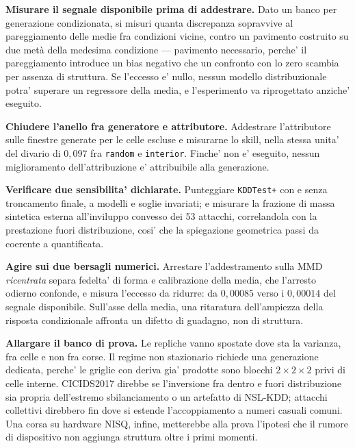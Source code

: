 \documentclass[10pt,conference,a4paper,twocolumn]{IEEEtran}
\begin{document}
\textbf{Misurare il segnale disponibile prima di addestrare.} Dato un banco per generazione condizionata, si misuri quanta discrepanza sopravvive al pareggiamento delle medie fra condizioni vicine, contro un pavimento costruito su due metà della medesima condizione — pavimento necessario, perche' il pareggiamento introduce un bias negativo che un confronto con lo zero scambia per assenza di struttura. Se l'eccesso e' nullo, nessun modello distribuzionale potra' superare un regressore della media, e l'esperimento va riprogettato anziche' eseguito.

\textbf{Chiudere l'anello fra generatore e attributore.} Addestrare l'attributore sulle finestre generate per le celle escluse e misurarne lo skill, nella stessa unita' del divario di $0{,}097$ fra \texttt{random} e \texttt{interior}. Finche' non e' eseguito, nessun miglioramento dell'attribuzione e' attribuibile alla generazione.

\textbf{Verificare due sensibilita' dichiarate.} Punteggiare \texttt{KDDTest+} con e senza troncamento finale, a modelli e soglie invariati; e misurare la frazione di massa sintetica esterna all'inviluppo convesso dei 53 attacchi, correlandola con la prestazione fuori distribuzione, cosi' che la spiegazione geometrica passi da coerente a quantificata.

\textbf{Agire sui due bersagli numerici.} Arrestare l'addestramento sulla MMD \emph{ricentrata} separa fedelta' di forma e calibrazione della media, che l'arresto odierno confonde, e misura l'eccesso da ridurre: da $0{,}00085$ verso i $0{,}00014$ del segnale disponibile. Sull'asse della media, una ritaratura dell'ampiezza della risposta condizionale affronta un difetto di guadagno, non di struttura.

\textbf{Allargare il banco di prova.} Le repliche vanno spostate dove sta la varianza, fra celle e non fra corse. Il regime non stazionario richiede una generazione dedicata, perche' le griglie con deriva gia' prodotte sono blocchi $2{\times}2{\times}2$ privi di celle interne. CICIDS2017 direbbe se l'inversione fra dentro e fuori distribuzione sia propria dell'estremo sbilanciamento o un artefatto di NSL-KDD; attacchi collettivi direbbero fin dove si estende l'accoppiamento a numeri casuali comuni. Una corsa su hardware NISQ, infine, metterebbe alla prova l'ipotesi che il rumore di dispositivo non aggiunga struttura oltre i primi momenti.



\end{document}
